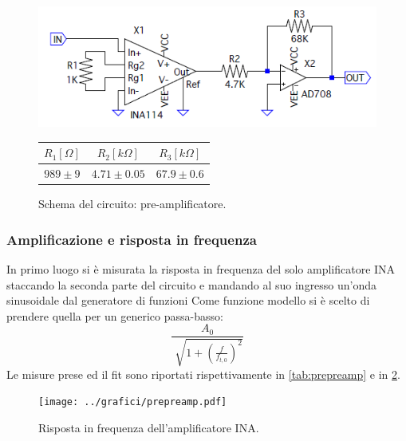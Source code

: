 \documentclass[a4paper,10pt]{article}
\begin{document}
\begin{figure}[H]
	\begin{minipage}{0.59\textwidth}
		\centering
		\includegraphics[width=\textwidth]{../grafici/PreAmp.png}
		\vspace{-12pt}
		\caption{Schema del circuito: pre-amplificatore.}
		\label{fig:preamp}
	\end{minipage}
	\begin{minipage}{0.39\textwidth}
		\centering
		\begin{tabular}{ccc}
			\hline
			$R_1[\Omega]$ & $R_2[k\Omega]$ & $R_3[k\Omega]$\\
			\hline
			$989\pm9$ & $4.71\pm0.05$ & $67.9\pm0.6$\\
			\hline
		\end{tabular}
		\label{tab:resistenze}
	\end{minipage}
\end{figure}

\subsubsection*{Amplificazione e risposta in frequenza}

In primo luogo si è misurata la risposta in frequenza del solo amplificatore INA staccando la seconda parte del circuito e mandando al suo ingresso un'onda sinusoidale dal generatore di funzioni%
Come funzione modello si è scelto di prendere quella per un generico passa-basso:
\begin{equation}
\frac{A_0}{\sqrt[]{1+(\frac{f}{f_{t,0}})^2}}
\end{equation}
Le misure prese ed il fit sono riportati rispettivamente in \cref{tab:prepreamp} e in \cref{fig:prepreamp}.


\vspace*{-10pt}
\begin{figure}[H]
	\centering
	\texttt{[image: ../grafici/prepreamp.pdf]}
	\vspace*{-10pt}
	\caption{Risposta in frequenza dell'amplificatore INA.}
	\label{fig:prepreamp}
\end{figure}
\vspace*{-10pt}
\end{document}
